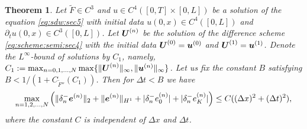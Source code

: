 \documentclass[dvipdfmx-if-dvi,autodetect-engine,ja=standard]{amsart}
\numberwithin{equation}{section} %
\def\vect#1{\mbox{\boldmath $#1$}} %
\newtheorem{theorem}[definition]{Theorem}
\begin{document}
\begin{theorem}\label{thm:error}
Let $\tilde{F} \in C^3$ and $u \in C^4([0,T]\times [0,L])$
be a solution of the equation \eqref{eq:sdw:sec5}
with initial data
$u(0,x) \in C^4([0,L])$
and 
$\partial_t u(0,x) \in C^3([0,L])$.
Let 
$\vect{U}^{(n)}$
be the solution of the difference scheme \eqref{eq:scheme:semi:sec4}
with the initial data
$\vect{U}^{(0)} = \vect{u}^{(0)}$
and
$\vect{U}^{(1)} = \vect{u}^{(1)}$. 
Denote the $L^{\infty}$-bound of solutions by $C_1$, namely, $C_1 := \max_{n=0,1,\ldots,N} \max \{ \| \vect{U}^{(n)} \|_{\infty}, \| \vect{u}^{(n)} \|_{\infty} \}$. 
Let us fix the constant $B$ satisfying $B < 1/(1 + C_{\tilde{F}''}(C_1))$. 
Then for $\Delta t < B$ we have 
\begin{align}
    \max_{n=1,2,\ldots,N} \left( \| \delta_n^- \vect{e}^{(n)} \|_2
    + \| \vect{e}^{(n)} \|_{H^1}
    + |\delta_n^- e_0^{(n)}|
    + |\delta_n^- e_K^{(n)}|
    \right) 
    \le C ((\Delta x)^2 + (\Delta t)^2), 
\end{align}
where the constant
$C$ is independent of
$\Delta x$ and $\Delta t$.
\end{theorem}
\end{document}
